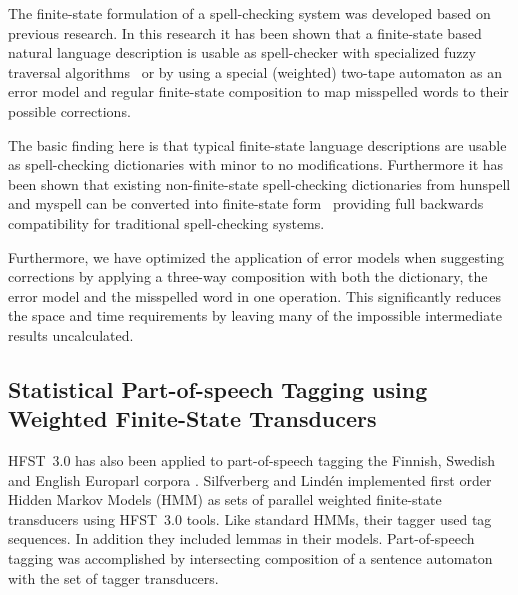 \documentclass{llncs}
\begin{document}
The finite-state formulation of a spell-checking system was developed based on
previous research. In this research it has been shown that a finite-state based
natural language description is usable as spell-checker with specialized fuzzy
traversal algorithms~\cite{oflazer/1996,hulden/2009} or by using a special
(weighted) two-tape automaton as an error model and regular finite-state
composition to map misspelled words to their possible
corrections\cite{agata/2002,pirinen/2010/lrec}.
 
The basic finding here is that typical finite-state language descriptions are
usable as spell-checking dictionaries with minor to no modifications.
Furthermore it has been shown that existing non-finite-state spell-checking
dictionaries from hunspell and myspell can be converted into finite-state
form~\cite{pirinen/2010/cla} providing full backwards compatibility for
traditional spell-checking systems.

Furthermore, we have optimized the application of error models when suggesting corrections
by applying a three-way composition with both the dictionary, the error model and the misspelled word in
one operation. This significantly reduces the space and time requirements by leaving many of the impossible
intermediate results uncalculated.

\subsection{Statistical Part-of-speech Tagging using Weighted Finite-State Transducers}
HFST~3.0 has also been applied to part-of-speech tagging the Finnish, Swedish
and English Europarl corpora \cite{silfverberg/2010}. Silfverberg and
Lind\'{e}n implemented first order Hidden Markov Models (HMM) as sets
of parallel weighted finite-state transducers using HFST~3.0 tools. Like
standard HMMs, their tagger used tag sequences. In addition they
included lemmas in their models. Part-of-speech tagging was
accomplished by intersecting composition of a sentence automaton with
the set of tagger transducers.
\end{document}
